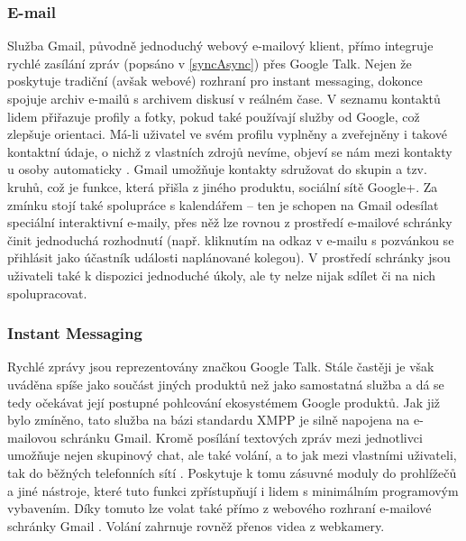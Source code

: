 \documentclass[12pt,oneside,final]{fithesis2}
\begin{document}
\subsubsection*{E-mail}
Služba Gmail, původně jednoduchý webový e-mailový klient, přímo integruje rychlé zasílání zpráv (popsáno v \ref{syncAsync}) přes Google Talk. Nejen že poskytuje tradiční (avšak webové) rozhraní pro instant messaging, dokonce spojuje archiv e-mailů s archivem diskusí v reálném čase. V seznamu kontaktů lidem přiřazuje profily a fotky, pokud také používají služby od Google, což zlepšuje orientaci. Má-li uživatel ve svém profilu vyplněny a zveřejněny i takové kontaktní údaje, o nichž z vlastních zdrojů nevíme, objeví se nám mezi kontakty u osoby automaticky \cite{striebeck2010gmail}. Gmail umožňuje kontakty sdružovat do skupin a tzv. kruhů, což je funkce, která přišla z jiného produktu, sociální sítě Google+. Za zmínku stojí také spolupráce s kalendářem -- ten je schopen na Gmail odesílat speciální interaktivní e-maily, přes něž lze rovnou z prostředí e-mailové schránky činit jednoduchá rozhodnutí (např. kliknutím na odkaz v e-mailu s pozvánkou se přihlásit jako účastník události naplánované kolegou). V prostředí schránky jsou uživateli také k dispozici jednoduché úkoly, ale ty nelze nijak sdílet či na nich spolupracovat.

\subsubsection*{Instant Messaging}
Rychlé zprávy jsou reprezentovány značkou Google Talk. Stále častěji je však uváděna spíše jako součást jiných produktů než jako samostatná služba a dá se tedy očekávat její postupné pohlcování ekosystémem Google produktů. Jak již bylo zmíněno, tato služba na bázi standardu XMPP je silně napojena na e-mailovou schránku Gmail. Kromě posílání textových zpráv mezi jednotlivci umožňuje nejen skupinový chat, ale také volání, a to jak mezi vlastními uživateli, tak do běžných telefonních sítí \cite{teague2010making}. Poskytuje k tomu zásuvné moduly do prohlížečů a jiné nástroje, které tuto funkci zpřístupňují i lidem s minimálním programovým vybavením. Díky tomuto lze volat také přímo z webového rozhraní e-mailové schránky Gmail \cite{schriebman2010call}. Volání zahrnuje rovněž přenos videa z webkamery.
\end{document}
